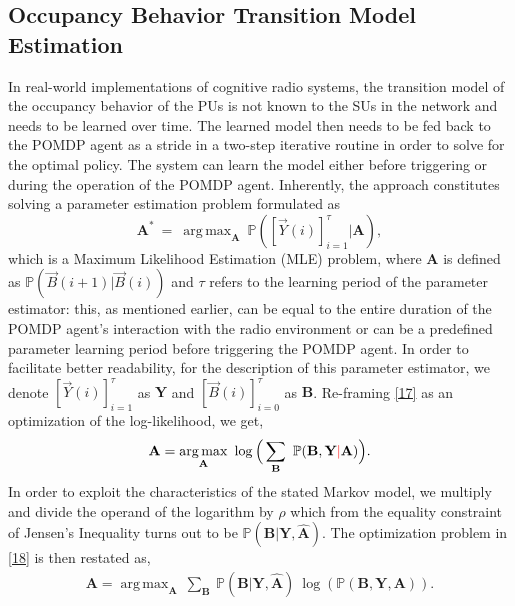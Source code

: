 \documentclass[10pt,twocolumn]{IEEEtran}
\newcommand{\sst}[1]{}
\newcommand{\nm}[1]{}
\DeclareMathOperator*{\argmax}{arg\,max}
\newcommand{\add}[1]{{\color{red}{#1}}}
\begin{document}
\subsection{Occupancy Behavior Transition Model Estimation}
In real-world implementations of cognitive radio systems, the transition model of the occupancy behavior of the PUs is not known to the SUs in the network and needs to be learned over time. The learned model then needs to be fed back to the POMDP agent as a stride in a two-step iterative routine in order to solve for the optimal policy. The system can learn the model either before triggering or during the operation of the POMDP agent. Inherently, the approach constitutes solving a parameter estimation problem formulated as
\begin{equation}\label{17}
    \mathbf{A}^{*}\ =\ \argmax_{\mathbf{A}}\ \mathbb{P}([\vec{Y}(i)]_{i=1}^{\tau}|\mathbf{A}),
\end{equation}
which is a Maximum Likelihood Estimation (MLE) problem, where $\mathbf{A}$ is defined as $\mathbb{P}(\vec{B}(i+1)|\vec{B}(i))$ and $\tau$ refers to the learning period of the parameter estimator: this, as mentioned earlier, can be equal to the entire duration of the POMDP agent's interaction with the radio environment or can be a predefined parameter learning period before triggering the POMDP agent. In order to facilitate better readability, for the description of this parameter estimator, we denote $[\vec{Y}(i)]_{i=1}^{\tau}$ as $\mathbf{Y}$ and $[\vec{B}(i)]_{i=0}^{\tau}$ as $\mathbf{B}$. Re-framing \eqref{17} as an optimization of the log-likelihood,\sst{ using the definition of marginal probability, and focusing on the joint instead of the conditional,} we get,
\begin{equation}\label{18}
    \mathbf{A} = \argmax_{\mathbf{A}}\ \log\Big(\sum_{\mathbf{B}}\ \mathbb{P}(\mathbf{B}, \mathbf{Y}\add{|} \mathbf{A})\Big).
\end{equation}
In order to exploit the characteristics of the stated Markov model, we multiply and divide the operand of the logarithm by $\rho$\nm{what is this?} which from the equality constraint of Jensen's Inequality turns out to be $\mathbb{P}(\mathbf{B}|\mathbf{Y}, \hat{\mathbf{A}})$. The optimization problem in \eqref{18} is then restated as,
\begin{equation}\label{19}
    \begin{aligned}
        \mathbf{A} = \argmax_{\mathbf{A}}\ \sum_{\mathbf{B}}\ \mathbb{P}(\mathbf{B}|\mathbf{Y}, \hat{\mathbf{A}})\ \log(\mathbb{P}(\mathbf{B}, \mathbf{Y}, \mathbf{A})).
    \end{aligned}
\end{equation}
\end{document}
